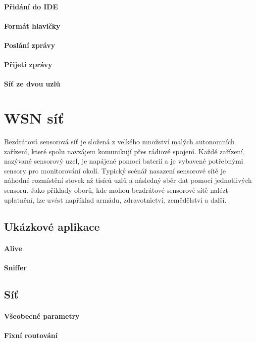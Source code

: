 \documentclass[12pt,titlepage]{article}
\begin{document}
		\paragraph{Přidání do IDE}
		\paragraph{Formát hlavičky}
		\paragraph{Poslání zprávy}
		\paragraph{Přijetí zprávy}
		\paragraph{Síť ze dvou uzlů}
	
\section{WSN síť}

	Bezdrátová sensorová síť je složená z velkého množství malých autonomních zařízení, které spolu navzájem komunikují přes rádiové spojení. Každé zařízení, nazývané sensorový uzel, je napájené pomocí 	baterií a je vybavené potřebnými sensory pro monitorování okolí. Typický scénář nasazení sensorové sítě je náhodné rozmístění stovek až tisíců uzlů a následný sběr dat pomocí jednotlivých sensorů. Jako příklady oborů, kde mohou bezdrátové sensorové sítě nalézt uplatnění, lze uvést například armádu, zdravotnictví, zemědělství a další.
	
	\subsection{Ukázkové aplikace}
		\paragraph{Alive}
		\paragraph{Sniffer}
	 
	\subsection{Síť}
		\paragraph{Všeobecné parametry}
		\paragraph{Fixní routování}
	
\end{document}
